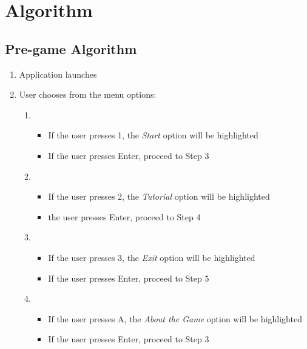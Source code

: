 \section{Algorithm}
\subsection{Pre-game Algorithm}

\begin{enumerate}
    \item Application launches
    \item User chooses from the menu options:
    \begin{enumerate}[label=\alph*.]
        \item
            \begin{itemize}[label={}]
                \item If the user presses 1, the \emph{Start} option will be highlighted
                \item \hspace{1cm} If the user presses Enter, proceed to Step 3
            \end{itemize}
        \item 
            \begin{itemize}[label={}]
                \item If the user presses 2, the \emph{Tutorial} option will be highlighted
                \item \hspace{1cm} the user presses Enter, proceed to Step 4
            \end{itemize}
        \item 
            \begin{itemize}[label={}]
                \item  If the user presses 3, the \emph{Exit} option will be highlighted
                \item \hspace{1cm} If the user presses Enter, proceed to Step 5
            \end{itemize}
        \item 
            \begin{itemize}[label={}]
                \item  If the user presses A, the \emph{About the Game} option will be highlighted
                \item \hspace{1cm} If the user presses Enter, proceed to Step 3
            \end{itemize}
        

\end{enumerate}
\end{enumerate}
